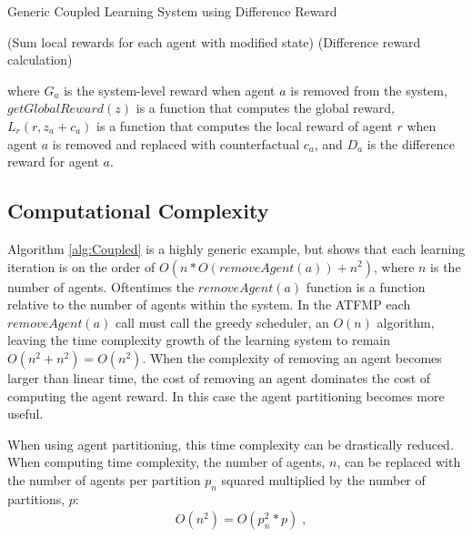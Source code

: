 \documentclass[onehalf,11pt]{beavtex}
\begin{document}
\begin{algorithm}
  \caption{Generic Coupled Learning System using Difference Reward}
  \begin{algorithmic}[1]
    \Statex
	       \hspace{5mm} (Sum local rewards for each agent with modified state)
	    \EndFor
	     \hspace{12mm} (Difference reward calculation)
  	  \EndFor        
    \EndFunction
  \end{algorithmic} \label{alg:Coupled}
\end{algorithm}

where $G_a$ is the system-level reward when agent $a$ is removed from the system, $getGlobalReward(z)$ is a function that computes the global reward, $L_r(r, z_a + c_a)$ is a function that computes the local reward of agent $r$ when agent $a$ is removed and replaced with counterfactual $c_a$, and $D_a$ is the difference reward for agent $a$. 

\subsection{Computational Complexity}
Algorithm \ref{alg:Coupled} is a highly generic example, but shows that each learning iteration is on the order of $O(n * O(removeAgent(a)) + n^2)$, where $n$ is the number of agents. Oftentimes the $removeAgent(a)$ function is a function relative to the number of agents within the system. In the ATFMP each $removeAgent(a)$ call must call the greedy scheduler, an $O(n)$ algorithm, leaving the time complexity growth of the learning system to remain $O(n^2 + n^2) = O(n^2)$. When the complexity of removing an agent becomes larger than linear time, the cost of removing an agent dominates the cost of computing the agent reward. In this case the agent partitioning becomes more useful.

When using agent partitioning, this time complexity can be drastically reduced. When computing time complexity, the number of agents, $n$, can be replaced with the number of agents per partition $p_n$ squared multiplied by the number of partitions, $p$: 
\begin{equation}
\begin{split}
&O(n^2) = O(p_n^2 * p)\;,
\end{split}
\end{equation}
\end{document}

